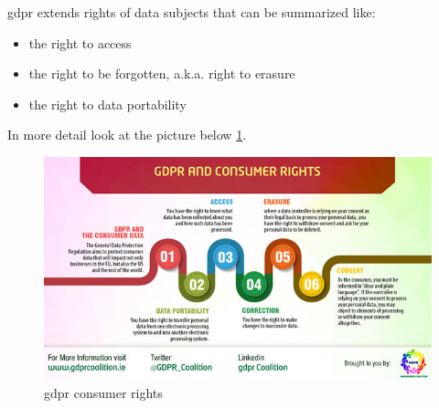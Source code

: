 \documentclass[thesis=M,english]{FITthesis}[2012/06/26]
\begin{document}
\acrshort{gdpr} extends rights of data subjects that can be summarized like:
\begin{itemize}[nosep]
\item the right to access
\item the right to be forgotten, a.k.a. right to erasure
\item the right to data portability\\
\end{itemize}

In more detail look at the picture below \ref{fig:gdpr_subject_rights}.
\begin{figure}[h!]\centering
	\includegraphics[width=1\textwidth]{pictures/gdpr_subject_rights}
	\caption{\acrshort{gdpr} consumer rights \cite{gdpr_subject_rights}}\label{fig:gdpr_subject_rights}
\end{figure}
\end{document}
